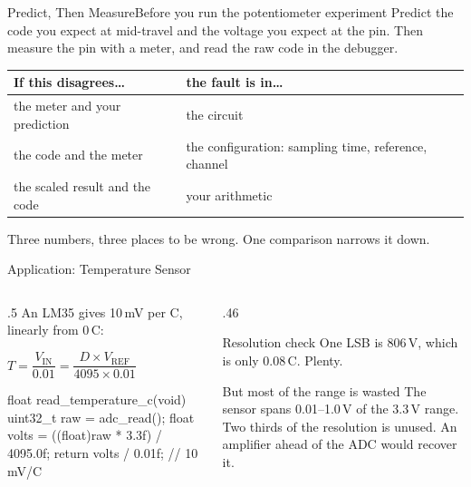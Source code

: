 \documentclass[9pt,aspectratio=169,xcolor=table]{beamer}
\begin{document}
\begin{frame}{Predict, Then Measure}{Before you run the potentiometer experiment}
    \leavevmode
    Predict the \alert{code} you expect at mid-travel and the \alert{voltage} you expect at the pin. Then measure the pin with a meter, and read the raw code in the debugger.

    \vspace{3mm}
    \begin{center}
    {\small
    \striped
    \begin{tabular}{@{}l l@{}}
        \toprule
        \textbf{If this disagrees\ldots} & \textbf{the fault is in\ldots} \\
        \midrule
        the meter and your prediction & the \alert{circuit} \\
        the code and the meter & the \alert{configuration}: sampling time, reference, channel \\
        the scaled result and the code & your \alert{arithmetic} \\
        \bottomrule
    \end{tabular}}
    \end{center}

    \vspace{3mm}
    {\small Three numbers, three places to be wrong. One comparison narrows it down.}
\end{frame}

\begin{frame}[fragile]{Application: Temperature Sensor}
    \begin{columns}[T]
    \begin{column}{.5\textwidth}
        An LM35 gives 10\,mV per \textdegree C, linearly from 0\,\textdegree C:

        \vspace{2mm}
        $T = \dfrac{V_{\text{IN}}}{0.01} = \dfrac{D \times V_{\text{REF}}}{4095 \times 0.01}$

        \vspace{3mm}
\begin{cc}[basicstyle=\ttfamily\scriptsize]
float read_temperature_c(void) {
    uint32_t raw = adc_read();
    float volts = ((float)raw * 3.3f)
                  / 4095.0f;
    return volts / 0.01f; // 10 mV/C
}
\end{cc}
    \end{column}
    \begin{column}{.46\textwidth}
        \begin{block}{Resolution check}
            One LSB is 806\,\textmu V, which is only \alert{0.08\,\textdegree C}. Plenty.
        \end{block}

        \vspace{2mm}
        \begin{block}{But most of the range is wasted}
            The sensor spans 0.01--1.0\,V of the 3.3\,V range. \alert{Two thirds of the resolution is unused.} An amplifier ahead of the ADC would recover it.
        \end{block}
    \end{column}
    \end{columns}
\end{frame}
\end{document}
